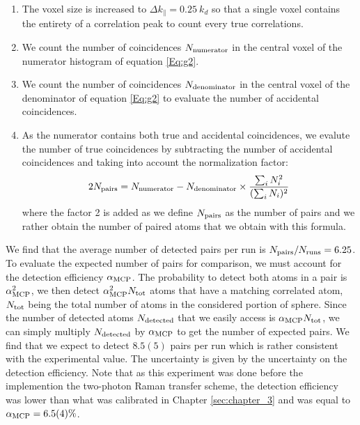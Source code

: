 \begin{enumerate}
    \item The voxel size is increased to $\Delta k_{\parallel} = 0.25 \ k_d$ so that a single voxel contains the entirety of a correlation peak to count every true correlations.
    
    \item We count the number of coincidences $N_{\rm{numerator}}$ in the central voxel of the numerator histogram of equation \ref{Eq:g2}. 
 
   
    \item  We count the number of coincidences $N_{\rm{denominator}}$ in the central voxel of the denominator of equation \ref{Eq:g2} to evaluate the number of accidental coincidences. 
    
    
    \item As the numerator contains both true and accidental coincidences, we evalute the number of true coincidences by subtracting the number of accidental coincidences and taking into account the normalization factor:
    \begin{equation}
          2N_{\rm{pairs}}=N_{\rm{numerator}} - N_{\rm{denominator}} \times \frac{\sum_i N_i^2}{(\sum_i N_i)^2}
    \end{equation}
    where the factor 2 is added as we define $N_{\rm{pairs}}$ as the number of pairs and we rather obtain the number of paired atoms that we obtain with this formula.
  
\end{enumerate}

We find that the average number of detected pairs per run is $N_{\rm{pairs}}/N_{\rm{runs}}=6.25$. To evaluate the expected number of pairs for comparison, we must account for the detection efficiency $\alpha_{\rm{MCP}}$. The probability to detect both atoms in a pair is $\alpha_{\rm{MCP}}^2$, we then detect $\alpha_{\rm{MCP}}^2 N_{\rm{tot}}$ atoms that have a matching correlated atom, $N_{\rm{tot}}$ being the total number of atoms in the considered portion of sphere. Since the number of detected atoms $N_{\rm{detected}}$ that we easily access is $\alpha_{\rm{MCP}} N_{\rm{tot}}$, we can simply multiply $N_{\rm{detected}}$ by $\alpha_{\rm{MCP}}$ to get the number of expected pairs. We find that we expect to detect $8.5(5)$ pairs per run which is rather consistent with the experimental value. The uncertainty is given by the uncertainty on the detection efficiency. Note that as this experiment was done before the implemention the two-photon Raman transfer scheme, the detection efficiency was lower than what was calibrated in Chapter \ref{sec:chapter_3} and was equal to $\alpha_{\rm{MCP}}=6.5(4) \%$.

